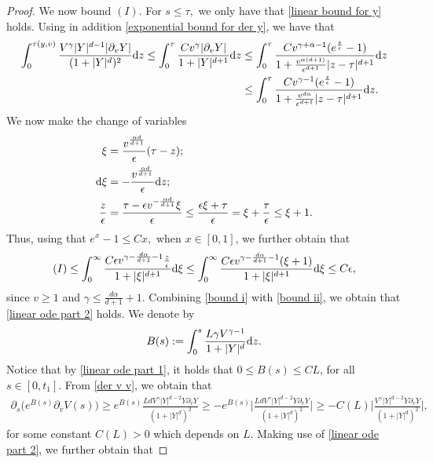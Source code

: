 \documentclass[11pt]{article}
\numberwithin{equation}{section}
\newcommand{\der}{\textup{d}}
\begin{document}
\begin{proof}
We now bound $(I)$. For $s\leq \tau,$ we only have that \eqref{linear bound for y} holds. Using in addition \eqref{exponential bound for der y}, we have that 
\begin{align*}
    \int_{0}^{\tau(y,v)}\frac{V^{\gamma}|Y|^{d-1}|\partial_{v}Y|} {(1+|Y|^{d})^{2}}\der z\leq   \int_{0}^{\tau}\frac{Cv^{\gamma}|\partial_{v}Y|}{1+|Y|^{d+1}}\der z&\leq \int_{0}^{\tau}\frac{C v^{\gamma+\alpha-1}(e^{\frac{z}{\epsilon}}-1)}{1+\frac{v^{\alpha(d+1)}}{\epsilon^{d+1}}|z-\tau|^{d+1}}\der z\\
    &\leq \int_{0}^{\tau}\frac{C v^{\gamma-1}(e^{\frac{z}{\epsilon}}-1)}{1+\frac{v^{d\alpha}}{\epsilon^{d+1}}|z-\tau|^{d+1}}\der z.
\end{align*}
We now make the change of variables 
\begin{align*}
    \xi&=\frac{v^{\frac{\alpha d}{d+1}}}{\epsilon}(\tau-z);\\
     \der \xi&=-\frac{v^{\frac{\alpha d}{d+1}}}{\epsilon}\der z;\\
     \frac{z}{\epsilon}&=\frac{\tau-\epsilon v^{-\frac{\alpha d}{d+1}}\xi}{\epsilon}\leq \frac{\epsilon \xi +\tau}{\epsilon}= \xi+\frac{\tau}{\epsilon}\leq\xi+1.
\end{align*}
Thus, using that $e^{x}-1\leq Cx,$ when $x\in[0,1]$, we further obtain that
\begin{align}\label{bound i}
    (I)\leq \int_{0}^{\infty}\frac{C\epsilon v^{\gamma-\frac{d\alpha}{d+1}-1}\frac{z}{\epsilon}}{1+|\xi|^{d+1}}\der \xi\leq \int_{0}^{\infty}\frac{C\epsilon v^{\gamma-\frac{d\alpha}{d+1}-1}(\xi+1)}{1+|\xi|^{d+1}}\der \xi\leq C\epsilon,
\end{align}
since $v\geq 1$ and $\gamma\leq \frac{d\alpha}{d+1}+1$. Combining \eqref{bound i} with \eqref{bound ii}, we obtain that \eqref{linear ode part 2} holds.
We denote by 
\begin{align*}
    B(s):=\int_{0}^{s}\frac{L\gamma V^{\gamma-1}}{1+|Y|^{d}}\der z.
\end{align*}
Notice that by \eqref{linear ode part 1}, it holds that $0\leq B(s)\leq CL$, for all $s\in[0,t_{1}]$.
From \eqref{der v v}, we obtain that
\begin{align*}
    \partial_{s}\big(e^{B(s)}\partial_{v}V(s)\big)\geq e^{B(s)}\frac{LdV^{\gamma}|Y|^{d-2}Y\partial_{v}Y}{(1+|Y|^{d})^{2}}\geq -e^{B(s)}\bigg|\frac{LdV^{\gamma}|Y|^{d-2}Y\partial_{v}Y}{(1+|Y|^{d})^{2}}\bigg|\geq -C(L)\bigg|\frac{V^{\gamma}|Y|^{d-2}Y\partial_{v}Y}{(1+|Y|^{d})^{2}}\bigg|,
\end{align*}
for some constant $C(L)>0$ which depends on $L$. Making use of \eqref{linear ode part 2}, we further obtain that

\end{proof}
\end{document}
